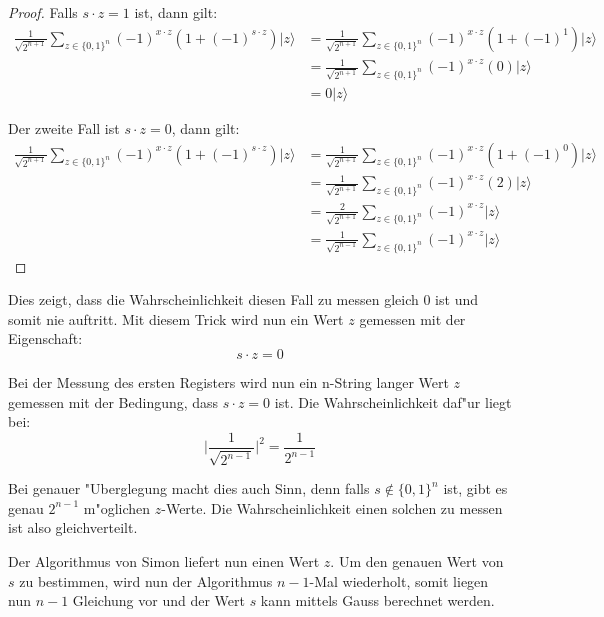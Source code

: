\begin{refsection}
\begin{proof}
Falls $s \cdot z = 1$ ist, dann gilt:
\begin{align*}
    \frac1{\sqrt{2^{n + 1}}}
      \sum_{z \in \{0,1\}^n}  { (-1)^{x \cdot z} ( 1 + (-1)^{ s \cdot z}) |z\rangle } 
    &= 
    \frac1{\sqrt{2^{n + 1}}}
      \sum_{z \in \{0,1\}^n}  { (-1)^{x \cdot z} ( 1 + (-1)^1) |z\rangle } 
    \\
    &= 
    \frac1{\sqrt{2^{n + 1}}}
      \sum_{z \in \{0,1\}^n}  { (-1)^{x \cdot z} (0) |z\rangle } 
    \\
    &=
    0 |z\rangle
\end{align*}

Der zweite Fall ist $s \cdot z = 0$, dann gilt:
\begin{align*}
    \frac1{\sqrt{2^{n + 1}}}
      \sum_{z \in \{0,1\}^n}  { (-1)^{x \cdot z} ( 1 + (-1)^{ s \cdot z}) |z\rangle } 
    &= 
    \frac1{\sqrt{2^{n + 1}}}
      \sum_{z \in \{0,1\}^n}  { (-1)^{x \cdot z} ( 1 + (-1)^0) |z\rangle } 
    \\
    &= 
    \frac1{\sqrt{2^{n + 1}}}
      \sum_{z \in \{0,1\}^n}  { (-1)^{x \cdot z} (2) |z\rangle } 
    \\
    &= 
    \frac{2}{\sqrt{2^{n + 1}}} 
      \sum_{z \in \{0,1\}^n}  { (-1)^{x \cdot z}|z\rangle } 
    \\
    &= 
    \frac1{\sqrt{2^{n - 1}}} 
      \sum_{z \in \{0,1\}^n}  { (-1)^{x \cdot z}|z\rangle } 
\end{align*}
\end{proof}
Dies zeigt, dass die Wahrscheinlichkeit diesen Fall zu messen gleich 0 ist und
somit nie auftritt. 
Mit diesem Trick wird nun ein Wert $z$ gemessen mit der Eigenschaft:
\[
    s \cdot z = 0
\]

Bei der Messung des ersten Registers wird nun ein n-String langer Wert $z$
gemessen mit der Bedingung, dass $s \cdot z = 0$ ist. Die Wahrscheinlichkeit
daf"ur liegt bei:
\[
    \biggl|\frac1{\sqrt{2^{n - 1}}}\biggr|^2 = \frac1{2^{n-1}} 
\]

Bei genauer "Uberglegung macht dies auch Sinn, denn falls $s \notin \{0,1\}^n$
ist, gibt es genau $2^{n-1}$ m"oglichen $z$-Werte. Die Wahrscheinlichkeit einen
solchen zu messen ist also gleichverteilt.

Der Algorithmus von Simon liefert nun einen Wert $z$. Um den genauen Wert von
$s$ zu bestimmen, wird nun der Algorithmus $n-1$-Mal wiederholt, somit liegen
nun $n-1$ Gleichung vor und der Wert $s$ kann mittels Gauss berechnet werden.


\end{refsection}
